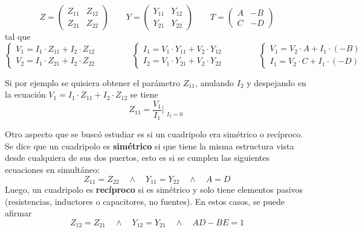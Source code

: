 \begin{equation*}
    Z  =
    \begin{pmatrix}
        Z_{11} & Z_{12} \\
        Z_{21} & Z_{22}
    \end{pmatrix}
    \qquad Y = 
    \begin{pmatrix}
        Y_{11} & Y_{12} \\
        Y_{21} & Y_{22}
    \end{pmatrix}
    \qquad T = 
    \begin{pmatrix}
        A & -B \\
        C & -D
    \end{pmatrix}
\end{equation*}
tal que
\begin{equation*}
    \begin{cases}
        V_1 = I_1 \cdot Z_{11} + I_2 \cdot Z_{12} \\ 
        V_2 = I_1 \cdot Z_{21} + I_2 \cdot Z_{22}
    \end{cases}
    \qquad \qquad
    \begin{cases}
        I_1 = V_1 \cdot Y_{11} + V_2 \cdot Y_{12} \\ 
        I_2 = V_1 \cdot Y_{21} + V_2 \cdot Y_{22}
    \end{cases}
    \qquad \qquad
    \begin{cases}
        V_1 = V_2 \cdot A + I_1 \cdot (-B) \\ 
        I_1 = V_2 \cdot C + I_1 \cdot (-D)
    \end{cases}
\end{equation*}

Si por ejemplo se quisiera obtener el parámetro $ Z_{11} $, anulando $ I_2$ y despejando en la ecuación $ V_1 = I_1 \cdot Z_{11} + I_2 \cdot Z_{12} $ se tiene
\begin{equation*}
    Z_{11} = \frac{V_1}{I_1} \Biggr|_{\substack{I_2=0}} %
\end{equation*}

\par Otro aspecto que se buscó estudiar es si un cuadripolo era simétrico o recíproco. Se dice que un cuadripolo es \textbf{simétrico} si que tiene la misma
estructura vista desde cualquiera de sus dos puertos, esto es si se cumplen las siguientes ecuaciones en simultáneo:
\begin{equation*}
    Z_{11}=Z_{22} \quad \wedge \quad Y_{11}=Y_{22} \quad \wedge \quad A=D
\end{equation*}
Luego, un cuadripolo es \textbf{recíproco} si es simétrico y solo tiene elementos pasivos (resistencias, inductores o capacitores, no 
fuentes). En estos casos, se puede afirmar
\begin{equation*}
    Z_{12}=Z_{21} \quad \wedge \quad Y_{12}=Y_{21} \quad \wedge \quad AD-BE=1
\end{equation*}

